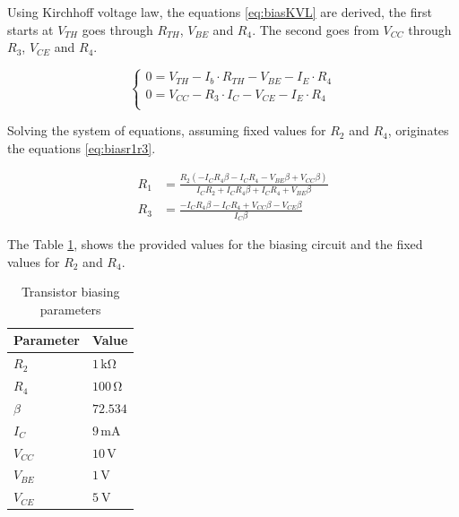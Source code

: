 Using Kirchhoff voltage law, the equations \ref{eq:biasKVL} are derived, the first starts at $V_{TH}$ goes through $R_{TH}$, $V_{BE}$ and $R_4$. The second goes from $V_{CC}$ through $R_3$, $V_{CE}$ and $R_4$. 

\begin{equation}
    \begin{cases}        
        0 = V_{TH} -I_b\cdot R_{TH} - V_{BE}-I_E\cdot R_4  \\
        0 = V_{CC} - R_3\cdot I_C - V_{CE} - I_E \cdot R_4\\
    \end{cases}
    \label{eq:biasKVL}
\end{equation}

Solving the system of equations, assuming fixed values for $R_2$ and $R_4$, originates the equations \ref{eq:biasr1r3}.

\begin{equation}
    \begin{split}
        R_1 &= \frac{R_{2} \left(- I_{C} R_{4} \beta - I_{C} R_{4} - V_{BE} \beta + V_ {CC} \beta\right)}{I_{C} R_{2} + I_{C} R_{4} \beta + I_{C} R_{4} + V_{BE} \beta}\\
        R_3 &= \frac{- I_{C} R_{4} \beta - I_{C} R_{4} + V_{CC} \beta - V_{CE} \beta}{I_{C} \beta}
    \end{split}
    \label{eq:biasr1r3}
\end{equation}

The Table \ref{tab:BiasParam}, shows the provided values for the biasing circuit and the fixed values for $R_2$ and $R_4$.

\begin{table}[h]
    \centering
    \caption{Transistor biasing parameters}
    \begin{tabularx}{\textwidth}{>{\centering\arraybackslash}X >{\centering\arraybackslash}X}
        \toprule
        \textbf{Parameter} & \textbf{Value} \\
        \midrule
        $R_2$     & $1\,\si{\kilo\ohm}$ \\
        \midrule
        $R_4$     & $100\,\si{\ohm}$\\
        \midrule
        $\beta$   & $72.534$ \\
        \midrule
        $I_C$     & $9\,\si{\milli\ampere}$ \\
        \midrule
        $V_{CC}$  & $10\,\si{\volt}$ \\
        \midrule
        $V_{BE}$  & $1\,\si{\volt}$ \\
        \midrule
        $V_{CE}$  & $\SI{5}{\volt}$\\
        \bottomrule
    \end{tabularx}
    \label{tab:BiasParam}
\end{table}

